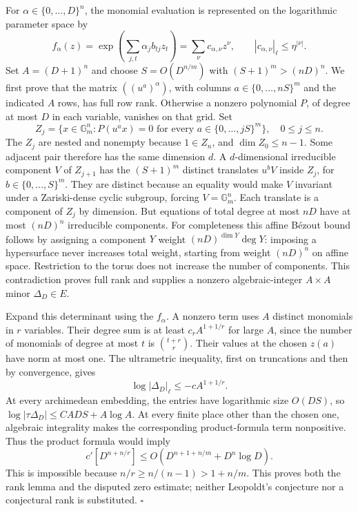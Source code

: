\documentclass[10pt,a4paper]{article}
\begin{document}
For \(\alpha\in\{0,\ldots,D\}^n\), the monomial evaluation is represented on the logarithmic parameter space by \[
 f_\alpha(z)=\exp\left(\sum_{j,t}\alpha_jb_{tj}z_t\right)
 =\sum_\nu c_{\alpha,\nu}z^\nu,
 \qquad |c_{\alpha,\nu}|_\ell\leq\eta^{|\nu|}.
\] Set \(A=(D+1)^n\) and choose \(S=O(D^{n/m})\) with \((S+1)^m>(nD)^n\). We first prove that the matrix \(((u^a)^\alpha)\), with columns \(a\in\{0,\ldots,nS\}^m\) and the indicated \(A\) rows, has full row rank. Otherwise a nonzero polynomial \(P\), of degree at most \(D\) in each variable, vanishes on that grid. Set \[
 Z_j=\{x\in\mathbb G_m^n:P(u^a x)=0\text{ for every }a\in\{0,\ldots,jS\}^m\},
 \quad0\leq j\leq n.
\] The \(Z_j\) are nested and nonempty because \(1\in Z_n\), and \(\dim Z_0\leq n-1\). Some adjacent pair therefore has the same dimension \(d\). A \(d\)-dimensional irreducible component \(V\) of \(Z_{j+1}\) has the \((S+1)^m\) distinct translates \(u^bV\) inside \(Z_j\), for \(b\in\{0,\ldots,S\}^m\). They are distinct because an equality would make \(V\) invariant under a Zariski-dense cyclic subgroup, forcing \(V=\mathbb G_m^n\). Each translate is a component of \(Z_j\) by dimension. But equations of total degree at most \(nD\) have at most \((nD)^n\) irreducible components. For completeness this affine B\'{e}zout bound follows by assigning a component \(Y\) weight \((nD)^{\dim Y}\deg Y\): imposing a hypersurface never increases total weight, starting from weight \((nD)^n\) on affine space. Restriction to the torus does not increase the number of components. This contradiction proves full rank and supplies a nonzero algebraic-integer \(A\times A\) minor \(\Delta_D\in E\).

Expand this determinant using the \(f_\alpha\). A nonzero term uses \(A\) distinct monomials in \(r\) variables. Their degree sum is at least \(c_rA^{1+1/r}\) for large \(A\), since the number of monomials of degree at most \(t\) is \(\binom{t+r}{r}\). Their values at the chosen \(z(a)\) have norm at most one. The ultrametric inequality, first on truncations and then by convergence, gives \[
 \log|\Delta_D|_\ell\leq-cA^{1+1/r}.
\] At every archimedean embedding, the entries have logarithmic size \(O(DS)\), so \(\log|\tau\Delta_D|\leq C ADS+A\log A\). At every finite place other than the chosen one, algebraic integrality makes the corresponding product-formula term nonpositive. Thus the product formula would imply \[
 c'[D^{n+n/r}]\leq O(D^{n+1+n/m}+D^n\log D).
\] This is impossible because \(n/r\geq n/(n-1)>1+n/m\). This proves both the rank lemma and the disputed zero estimate; neither Leopoldt's conjecture nor a conjectural rank is substituted. \(\square\)
\end{document}
